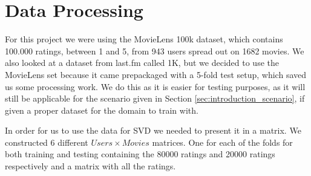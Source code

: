 \section{Data Processing}\label{sec:data_preprocessing}
For this project we were using the MovieLens 100k dataset, which contains 100.000 ratings, between 1 and 5, from 943 users spread out on 1682 movies\cite{movielens100k}. 
We also looked at a dataset from last.fm called 1K\cite{lastfmdataset}, but we decided to use the MovieLens set because it came prepackaged with a 5-fold test setup, which saved us some processing work. We do this as it is easier for testing purposes, as it will still be applicable for the scenario given in Section \ref{sec:introduction_scenario}, if given a proper dataset for the domain to train with.

In order for us to use the data for SVD we needed to present it in a matrix. We constructed 6 different $Users \times Movies$ matrices. One for each of the folds for both training and testing containing the 80000 ratings and 20000 ratings respectively and a matrix with all the ratings.